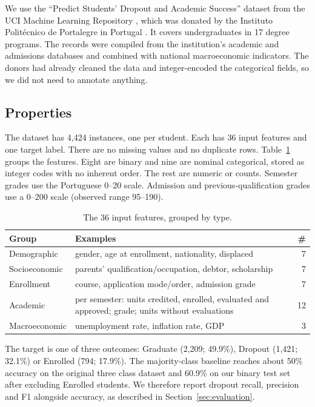 \documentclass[11pt]{article}
\begin{document}
We use the ``Predict Students' Dropout and Academic Success'' dataset from the UCI Machine Learning Repository \citep{realinho2021uci}, which was donated by the Instituto Polit\'{e}cnico de Portalegre in Portugal \citep{realinho2022data}.
It covers undergraduates in 17 degree programs.
The records were compiled from the institution's academic and admissions databases and combined with national macroeconomic indicators.
The donors had already cleaned the data and integer-encoded the categorical fields, so we did not need to annotate anything.

\subsection{Properties}

The dataset has 4,424 instances, one per student.
Each has 36 input features and one target label.
There are no missing values and no duplicate rows.
Table~\ref{tab:feature-groups} groups the features.
Eight are binary and nine are nominal categorical, stored as integer codes with no inherent order.
The rest are numeric or counts.
Semester grades use the Portuguese 0--20 scale.
Admission and previous-qualification grades use a 0--200 scale (observed range 95--190).

\begin{table}[t]
  \centering
  \small
  \setlength{\tabcolsep}{4pt}
  \begin{tabular}{l>{\raggedright\arraybackslash}p{4.3cm}r}
    \hline
    \textbf{Group} & \textbf{Examples} & \textbf{\#} \\
    \hline
    Demographic   & gender, age at enrollment, nationality, displaced & 7 \\
    Socioeconomic & parents' qualification/occupation, debtor, scholarship & 7 \\
    Enrollment    & course, application mode/order, admission grade & 7 \\
    Academic      & per semester: units credited, enrolled, evaluated and approved; grade; units without evaluations & 12 \\
    Macroeconomic & unemployment rate, inflation rate, GDP & 3 \\
    \hline
  \end{tabular}
  \caption{\label{tab:feature-groups}
    The 36 input features, grouped by type.
  }
\end{table}

The target is one of three outcomes: Graduate (2,209; 49.9\%), Dropout (1,421; 32.1\%) or Enrolled (794; 17.9\%).
The majority-class baseline reaches about 50\% accuracy on the original three class dataset and 60.9\% on our binary test set after excluding Enrolled students.
We therefore report dropout recall, precision and F1 alongside accuracy, as described in Section~\ref{sec:evaluation}.
\end{document}
